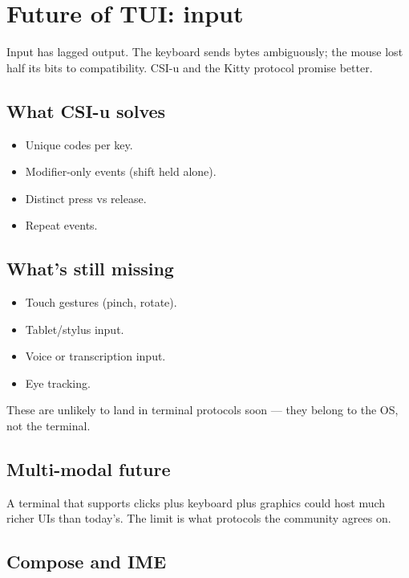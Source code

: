 \chapter{Future of TUI: input}
\label{ch:future_input}

\begin{aside}
Input has lagged output. The keyboard sends bytes
ambiguously; the mouse lost half its bits to compatibility.
CSI-u and the Kitty protocol promise better.
\end{aside}

\section{What CSI-u solves}

\begin{itemize}[leftmargin=*]
  \item Unique codes per key.
  \item Modifier-only events (shift held alone).
  \item Distinct press vs release.
  \item Repeat events.
\end{itemize}

\section{What's still missing}

\begin{itemize}[leftmargin=*]
  \item Touch gestures (pinch, rotate).
  \item Tablet/stylus input.
  \item Voice or transcription input.
  \item Eye tracking.
\end{itemize}

These are unlikely to land in terminal protocols soon ---
they belong to the OS, not the terminal.

\section{Multi-modal future}

A terminal that supports clicks plus keyboard plus
graphics could host much richer UIs than today's. The
limit is what protocols the community agrees on.

\section{Compose and IME}

